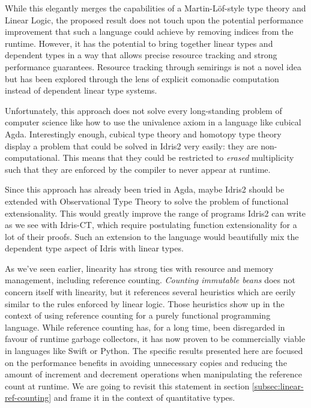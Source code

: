 \documentclass[
]{article}
\begin{document}
While this elegantly merges the capabilities of a Martin-Löf-style type
theory\cite{martin-lof} and Linear Logic\cite{linear-logic}, the
proposed result does not touch upon the potential performance
improvement that such a language could achieve by removing indices from
the runtime\cite{store_indices}. However, it has the potential to bring
together linear types and dependent types in a way that allows precise
resource tracking and strong performance guarantees. Resource tracking
through semirings is not a novel idea but has been explored through the
lens of explicit comonadic computation \cite{parametric_effects} instead
of dependent linear type systems.

Unfortunately, this approach does not solve every long-standing problem
of computer science like how to use the univalence axiom in a language
like cubical Agda\cite{cubical_agda}. Interestingly enough, cubical type
theory and homotopy type theory display a problem that could be solved
in Idris2 very easily: they are non-computational. This means that they
could be restricted to \emph{erased} multiplicity such that they are
enforced by the compiler to never appear at runtime.

Since this approach has already been tried in Agda\cite{agda}, maybe
Idris2 should be extended with Observational Type Theory \cite{ott} to
solve the problem of functional extensionality. This would greatly
improve the range of programs Idris2 can write as we see with
Idris-CT\cite{idris-ct}, which require postulating function
extensionality for a lot of their proofs. Such an extension to the
language would beautifully mix the dependent type aspect of Idris with
linear types.

As we've seen earlier, linearity has strong ties with resource and
memory management, including reference counting. \emph{Counting
immutable beans}\cite{immutable_beans} does not concern itself with
linearity, but it references several heuristics which are eerily similar
to the rules enforced by linear logic. Those heuristics show up in the
context of using reference counting for a purely functional programming
language. While reference counting has, for a long time, been
disregarded in favour of runtime garbage collectors, it has now proven
to be commercially viable in languages like Swift or Python. The
specific results presented here are focused on the performance benefits
in avoiding unnecessary copies and reducing the amount of increment and
decrement operations when manipulating the reference count at runtime.
We are going to revisit this statement in section
\ref{subsec:linear-ref-counting} and frame it in the context of
quantitative types.
\end{document}
